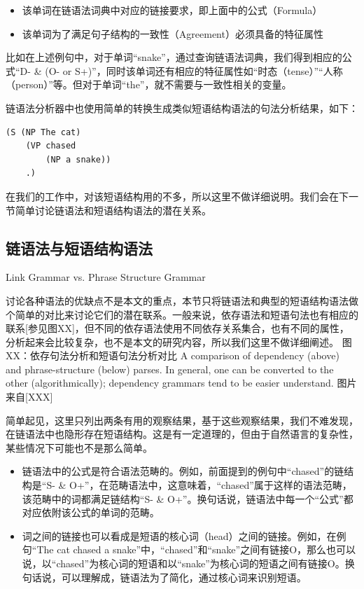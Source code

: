 \begin{itemize}
\item 该单词在链语法词典中对应的链接要求，即上面中的公式（Formula）
\item 该单词为了满足句子结构的一致性（Agreement）必须具备的特征属性
\end{itemize}

比如在上述例句中，对于单词“snake”，通过查询链语法词典，我们得到相应的公式“D- \& (O- or S+)”，同时该单词还有相应的特征属性如“时态（tense）”“人称（person）”等。但对于单词“the”，就不需要与一致性相关的变量。

链语法分析器中也使用简单的转换生成类似短语结构语法的句法分析结果，如下：

{\tt\begin{small}\begin{lstlisting}
(S (NP The cat)
	(VP chased
	 	(NP a snake))
 	.)
\end{lstlisting}\end{small}}

在我们的工作中，对该短语结构用的不多，所以这里不做详细说明。我们会在下一节简单讨论链语法和短语结构语法的潜在关系。

\subsection{链语法与短语结构语法}{Link Grammar vs. Phrase Structure Grammar}

讨论各种语法的优缺点不是本文的重点，本节只将链语法和典型的短语结构语法做个简单的对比来讨论它们的潜在联系。一般来说，依存语法和短语句法也有相应的联系[参见图XX]，但不同的依存语法使用不同依存关系集合，也有不同的属性，分析起来会比较复杂，也不是本文的研究内容，所以我们这里不做详细阐述。
图XX：依存句法分析和短语句法分析对比
A comparison of dependency (above) and phrase-structure (below) parses.
In general, one can be converted to the other (algorithmically); dependency
grammars tend to be easier understand.
图片来自[XXX]

简单起见，这里只列出两条有用的观察结果，基于这些观察结果，我们不难发现，在链语法中也隐形存在短语结构。这是有一定道理的，但由于自然语言的复杂性，某些情况下可能也不是那么简单。

\begin{itemize}
\item 链语法中的公式是符合语法范畴的。例如，前面提到的例句中“chased”的链结构是“S- \& O+”，在范畴语法中，这意味着，“chased”属于这样的语法范畴，该范畴中的词都满足链结构“S- \& O+”。换句话说，链语法中每一个“公式”都对应依附该公式的单词的范畴。 
\item 词之间的链接也可以看成是短语的核心词（head）之间的链接。例如，在例句“The cat chased a snake”中，“chased”和“snake”之间有链接O，那么也可以说，以“chased”为核心词的短语和以“snake”为核心词的短语之间有链接O。换句话说，可以理解成，链语法为了简化，通过核心词来识别短语。
\end{itemize}


